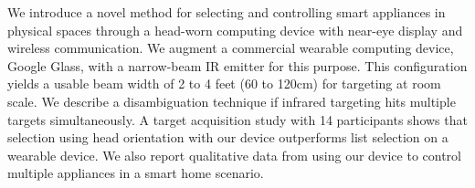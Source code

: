 We introduce a novel method for selecting and controlling smart appliances in physical spaces through a head-worn computing device with near-eye display and wireless communication. We augment a commercial wearable computing device, Google Glass, with a narrow-beam IR emitter for this purpose. This configuration yields a usable beam width of 2 to 4 feet (60 to 120cm) for targeting at room scale. We  describe a disambiguation technique if infrared targeting hits multiple targets simultaneously. A target acquisition study with 14 participants shows that selection using head orientation with our device outperforms list selection on a wearable device. We also report qualitative data from using our device to control multiple appliances in a smart home scenario.